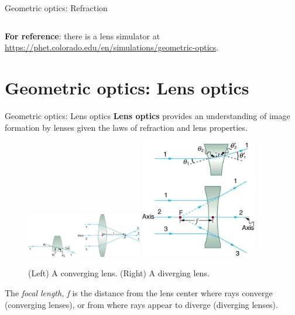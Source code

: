 \documentclass{beamer}
\begin{document}
\begin{frame}{Geometric optics: Refraction}
\begin{columns}[T]
\begin{column}{0.5\textwidth}
\end{column}
\end{columns}
\footnotesize
\textbf{For reference}: there is a lens simulator at \url{https://phet.colorado.edu/en/simulations/geometric-optics}.
\end{frame}

\section{Geometric optics: Lens optics}

\begin{frame}{Geometric optics: Lens optics}
\textbf{\alert{Lens optics}} provides an understanding of image formation by lenses given the laws of refraction and lens properties.
\begin{figure}
\centering
\includegraphics[width=0.45\textwidth,trim=13.5cm 0cm 0cm 0cm,clip=true]{figures/lens.png}
\includegraphics[width=0.45\textwidth,trim=0cm 0cm 0cm 11.5cm,clip=true]{figures/lens2.png}
\caption{\label{fig:lens} (Left) A converging lens. (Right) A diverging lens.}
\end{figure}
\small
The \textit{focal length, f} is the distance from the lens center where rays converge (converging lenses), or from where rays appear to diverge (diverging lenses).
\end{frame}
\end{document}
